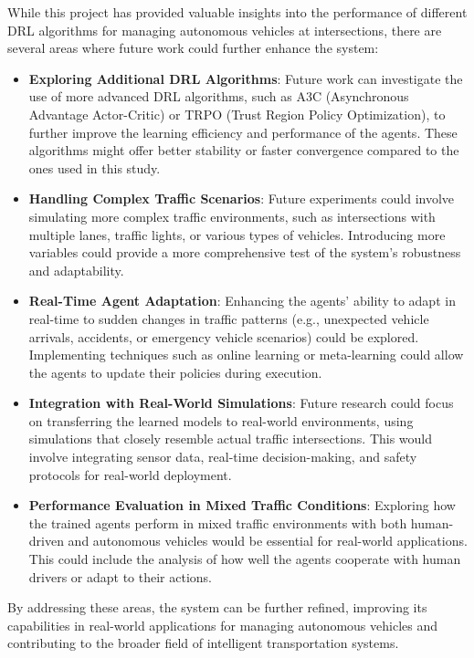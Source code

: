 While this project has provided valuable insights into the performance of different DRL algorithms for managing autonomous vehicles at intersections, there are several areas where future work could further enhance the system:

\begin{itemize}
    \item \textbf{Exploring Additional DRL Algorithms}: Future work can investigate the use of more advanced DRL algorithms, such as A3C (Asynchronous Advantage Actor-Critic) or TRPO (Trust Region Policy Optimization), to further improve the learning efficiency and performance of the agents. These algorithms might offer better stability or faster convergence compared to the ones used in this study.
    \item \textbf{Handling Complex Traffic Scenarios}: Future experiments could involve simulating more complex traffic environments, such as intersections with multiple lanes, traffic lights, or various types of vehicles. Introducing more variables could provide a more comprehensive test of the system's robustness and adaptability.
    \item \textbf{Real-Time Agent Adaptation}: Enhancing the agents' ability to adapt in real-time to sudden changes in traffic patterns (e.g., unexpected vehicle arrivals, accidents, or emergency vehicle scenarios) could be explored. Implementing techniques such as online learning or meta-learning could allow the agents to update their policies during execution.
    \item \textbf{Integration with Real-World Simulations}: Future research could focus on transferring the learned models to real-world environments, using simulations that closely resemble actual traffic intersections. This would involve integrating sensor data, real-time decision-making, and safety protocols for real-world deployment.
    \item \textbf{Performance Evaluation in Mixed Traffic Conditions}: Exploring how the trained agents perform in mixed traffic environments with both human-driven and autonomous vehicles would be essential for real-world applications. This could include the analysis of how well the agents cooperate with human drivers or adapt to their actions.
\end{itemize}

By addressing these areas, the system can be further refined, improving its capabilities in real-world applications for managing autonomous vehicles and contributing to the broader field of intelligent transportation systems.